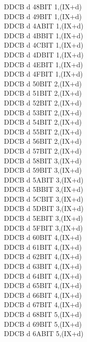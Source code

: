 \begin{multicols}{3}
{\begin{tabbing}
    DDCB d 48\>BIT 1,(IX+d)\UNDOC\\
    DDCB d 49\>BIT 1,(IX+d)\UNDOC\\
    DDCB d 4A\>BIT 1,(IX+d)\UNDOC\\
    DDCB d 4B\>BIT 1,(IX+d)\UNDOC\\
    DDCB d 4C\>BIT 1,(IX+d)\UNDOC\\
    DDCB d 4D\>BIT 1,(IX+d)\UNDOC\\
    DDCB d 4E\>BIT 1,(IX+d)\\
    DDCB d 4F\>BIT 1,(IX+d)\UNDOC\\
    DDCB d 50\>BIT 2,(IX+d)\UNDOC\\
    DDCB d 51\>BIT 2,(IX+d)\UNDOC\\
    DDCB d 52\>BIT 2,(IX+d)\UNDOC\\
    DDCB d 53\>BIT 2,(IX+d)\UNDOC\\
    DDCB d 54\>BIT 2,(IX+d)\UNDOC\\
    DDCB d 55\>BIT 2,(IX+d)\UNDOC\\
    DDCB d 56\>BIT 2,(IX+d)\\
    DDCB d 57\>BIT 2,(IX+d)\UNDOC\\
    DDCB d 58\>BIT 3,(IX+d)\UNDOC\\
    DDCB d 59\>BIT 3,(IX+d)\UNDOC\\
    DDCB d 5A\>BIT 3,(IX+d)\UNDOC\\
    DDCB d 5B\>BIT 3,(IX+d)\UNDOC\\
    DDCB d 5C\>BIT 3,(IX+d)\UNDOC\\
    DDCB d 5D\>BIT 3,(IX+d)\UNDOC\\
    DDCB d 5E\>BIT 3,(IX+d)\\
    DDCB d 5F\>BIT 3,(IX+d)\UNDOC\\
    DDCB d 60\>BIT 4,(IX+d)\UNDOC\\
    DDCB d 61\>BIT 4,(IX+d)\UNDOC\\
    DDCB d 62\>BIT 4,(IX+d)\UNDOC\\
    DDCB d 63\>BIT 4,(IX+d)\UNDOC\\
    DDCB d 64\>BIT 4,(IX+d)\UNDOC\\
    DDCB d 65\>BIT 4,(IX+d)\UNDOC\\
    DDCB d 66\>BIT 4,(IX+d)\\
    DDCB d 67\>BIT 4,(IX+d)\UNDOC\\
    DDCB d 68\>BIT 5,(IX+d)\UNDOC\\
    DDCB d 69\>BIT 5,(IX+d)\UNDOC\\
    DDCB d 6A\>BIT 5,(IX+d)\UNDOC\\

\end{tabbing}}
\end{multicols}
